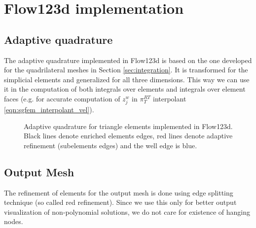 
\section{Flow123d implementation}

\subsection{Adaptive quadrature}
The adaptive quadrature implemented in Flow123d is based on the one developed for the quadrilateral meshes
in Section \ref{sec:integration}. It is transformed for the simplicial elements and generalized for
all three dimensions. This way we can use it in the computation of both integrals over elements and integrals
over element faces (e.g. for accurate computation of $z^w_j$ in $\pi^{RT}_T$ interpolant \eqref{eqn:sgfem_interpolant_vel}).

\begin{figure}[!htb]
  \centering    
  \hspace{0pt}
  \caption[Adaptive quadrature in Flow123d]
  {Adaptive quadrature for triangle elements implemented in Flow123d.
   Black lines denote enriched elements edges, red lines denote adaptive refinement (subelements edges) and the well
   edge is blue.
  }
  \label{fig:adapt_refinement_flow123d}
\end{figure}

\subsection{Output Mesh}
\label{sec:output_mesh}

The refinement of elements for the output mesh is done using edge splitting technique (so called red refinement).
Since we use this only for better output visualization of non-polynomial solutions, we do not
care for existence of hanging nodes.

